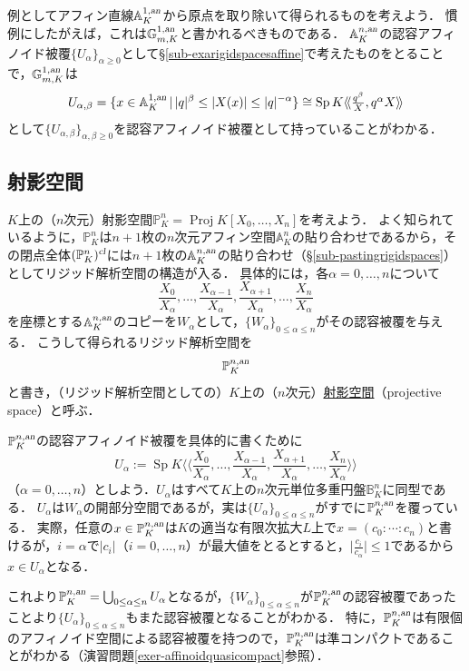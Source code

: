 \documentclass[a4paper,12pt, dvipdfmx]{jsbook}
\def\G{\mathbb{G}}
\def\P{\mathbb{P}}
\def\A{\mathbb{A}}
\def\B{\mathbb{B}}
\def\cl{\mathop{\textsl{cl}}\nolimits}
\def\Sp{\mathop{\mathrm{Sp}}\nolimits}
\def\Proj{\mathop{\mathrm{Proj}}\nolimits}
\def\an{\textsl{an}}
\def\dl{\langle\!\langle}
\def\dr{\rangle\!\rangle}
\newcommand{\abs}[1]{\lvert#1\rvert}
\theoremstyle{plain}
\theoremstyle{definition}
\begin{document}
例としてアフィン直線$\A^{1,\an}_K$から原点を取り除いて得られるものを考えよう．
慣例にしたがえば，これは$\G_{m,K}^{1,\an}$と書かれるべきものである．
$\A^{n,\an}_K$の認容アフィノイド被覆$\{U_{\alpha}\}_{\alpha\geq 0}$として\S\ref{sub-exarigidspacesaffine}で考えたものをとることで，$\G_{m,K}^{1,\an}$は
$$
U_{\alpha,\beta}=\{x\in\A^{1,\an}_K\,|\,\abs{q}^{\beta}\leq\abs{X(x)}\leq\abs{q}^{-\alpha}\}\cong\Sp K\dl {\textstyle \frac{q^{\beta}}{X},q^{\alpha}X}\dr
$$
として$\{U_{\alpha,\beta}\}_{\alpha,\beta\geq 0}$を認容アフィノイド被覆として持っていることがわかる．

\subsection{射影空間}\label{sub-exaprojectivepace}
$K$上の（$n$次元）射影空間$\P^n_K=\Proj K[X_0,\ldots,X_n]$を考えよう．
よく知られているように，$\P^n_K$は$n+1$枚の$n$次元アフィン空間$\A^n_K$の貼り合わせであるから，その閉点全体$(\P^n_K)^{\cl}$には$n+1$枚の$\A^{n,\an}_K$の貼り合わせ（\S\ref{sub-pastingrigidspaces}）としてリジッド解析空間の構造が入る．
具体的には，各$\alpha=0,\ldots,n$について
$$
\frac{X_0}{X_{\alpha}},\ldots,\frac{X_{\alpha-1}}{X_{\alpha}},\frac{X_{\alpha+1}}{X_{\alpha}},\ldots,\frac{X_n}{X_{\alpha}}
$$
を座標とする$\A^{n,\an}_K$のコピーを$W_{\alpha}$として，$\{W_{\alpha}\}_{0\leq\alpha\leq n}$がその認容被覆を与える．
こうして得られるリジッド解析空間を
$$
\P^{n,\an}_K
$$
と書き，（リジッド解析空間としての）$K$上の（$n$次元）\underline{射影空間}（projective space）と呼ぶ．

$\P^{n,\an}_K$の認容アフィノイド被覆を具体的に書くために
$$
U_{\alpha}:=\Sp K\dl {\textstyle \frac{X_0}{X_{\alpha}},\ldots,\frac{X_{\alpha-1}}{X_{\alpha}},\frac{X_{\alpha+1}}{X_{\alpha}},\ldots,\frac{X_n}{X_{\alpha}}}\dr
$$
（$\alpha=0,\ldots,n$）としよう．$U_{\alpha}$はすべて$K$上の$n$次元単位多重円盤$\B^n_K$に同型である．
$U_{\alpha}$は$W_{\alpha}$の開部分空間であるが，実は$\{U_{\alpha}\}_{0\leq\alpha\leq n}$がすでに$\P^{n,\an}_K$を覆っている．
実際，任意の$x\in\P^{n,\an}_K$は$K$の適当な有限次拡大$L$上で$x=(c_0:\cdots:c_n)$と書けるが，$i=\alpha$で$\abs{c_i}$（$i=0,\ldots,n$）が最大値をとるとすると，$\abs{\frac{c_i}{c_{\alpha}}}\leq 1$であるから$x\in U_{\alpha}$となる．

これより$\P^{n,\an}_K=\bigcup_{0\leq\alpha\leq n}U_{\alpha}$となるが，$\{W_{\alpha}\}_{0\leq\alpha\leq n}$が$\P^{n,\an}_K$の認容被覆であったことより$\{U_{\alpha}\}_{0\leq\alpha\leq n}$もまた認容被覆となることがわかる．
特に，$\P^{n,\an}_K$は有限個のアフィノイド空間による認容被覆を持つので，$\P^{n,\an}_K$は準コンパクトであることがわかる（演習問題\ref{exer-affinoidquasicompact}参照）．
\end{document}
